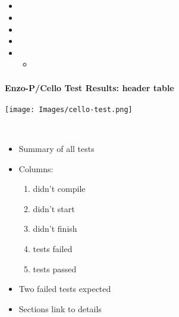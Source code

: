 \NEWSEC

\subsection{\ssTesting}

\begin{frame}[fragile,label=ss-testing] 
\secframetitle{\ssTesting}
\begin{itemize}
\item {} 
\item {} 
\item {} 
\item {} 
\item {}  
\begin{itemize}
\item {}
\end{itemize}
\end{itemize}
\end{frame}

\begin{frame}[fragile] 
\secframetitle{\ssTesting}
\framesubtitle{Enzo-P/Cello Test Results: header table}
\begin{minipage}{2.0in}
\texttt{[image: Images/cello-test.png]}
\end{minipage} \ 
\begin{minipage}{2.0in}
\begin{itemize}
\item Summary of all tests
\item Columns:
\footnotesize
\begin{enumerate}
\item didn't compile
\item didn't start
\item didn't finish
\item tests failed
\item tests passed
\end{enumerate}
\small
\item Two failed tests expected
\item Sections link to details
\end{itemize}
\end{minipage}
\end{frame}

